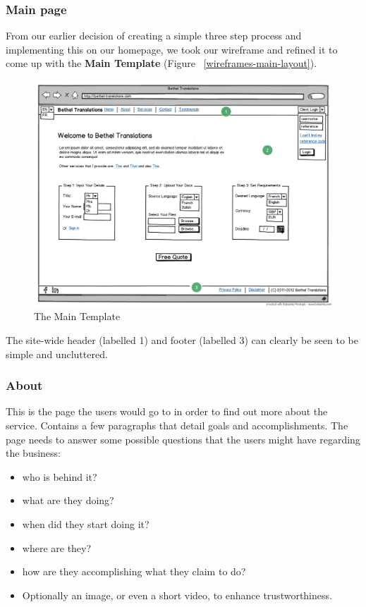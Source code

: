 \documentclass{l3proj}
\begin{document}
\subsubsection{Main page}
From our earlier decision of creating a simple three step process and
implementing this on our homepage, we took our wireframe and refined it to
come up with the  \textbf{Main Template} (Figure ~\ref{wireframes-main-layout}).

\begin{figure}[ht]
\label{wireframes:main-template}
\begin{center}
\includegraphics[width=\linewidth]{wireframes/bt-homepagev3}
\caption{The Main Template}
\end{center}
\end{figure}

The site-wide header (labelled 1) and footer (labelled 3) can clearly be seen to be simple and uncluttered.


\subsubsection{About}
This is the page the users would go to in order to find out more about the
service. Contains a few paragraphs that detail goals and accomplishments.
The page needs to answer some possible questions that the users might have
regarding the business:
\begin{itemize}
	\item who is behind it?
	\item what are they doing?
	\item when did they start doing it?
	\item where are they?
	\item how are they accomplishing what they claim to do?
	\item Optionally an image, or even a short video, to enhance trustworthiness.
\end{itemize}
\end{document}
